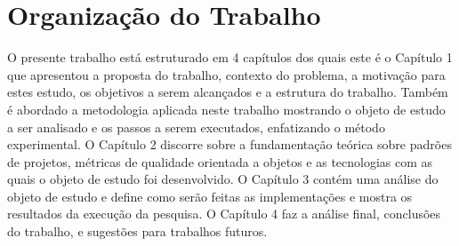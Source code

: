 \section{Organização do Trabalho}

O presente trabalho está estruturado em 4 capítulos dos quais este é o
Capítulo 1 que apresentou a proposta do trabalho, contexto do problema, a
motivação para estes estudo, os objetivos a serem alcançados e a estrutura do
trabalho. Também é abordado a metodologia aplicada neste trabalho mostrando o
objeto de estudo a ser analisado e os passos a serem executados, enfatizando o
método experimental.
O Capítulo 2 discorre sobre a fundamentação teórica sobre padrões de projetos,
métricas de qualidade orientada a objetos e as tecnologias com as quais o objeto
de estudo foi desenvolvido.
O Capítulo 3 contém uma análise do objeto de estudo e define como serão feitas
as implementações e mostra os resultados da execução da pesquisa.
O Capítulo 4 faz a análise final, conclusões do trabalho, e sugestões para
trabalhos futuros.

